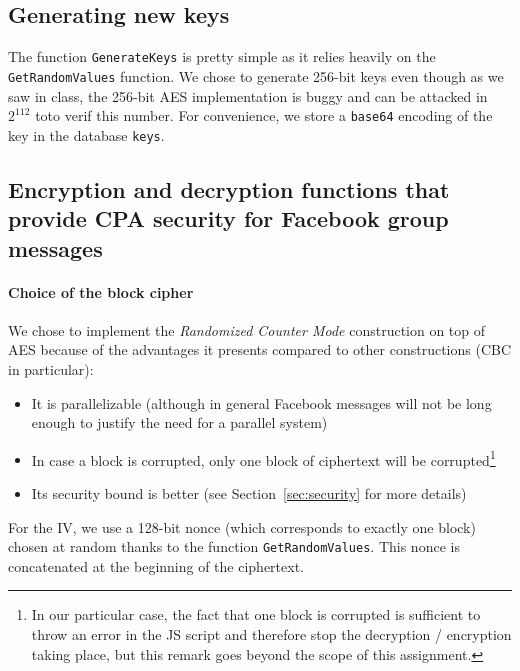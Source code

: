 \documentclass[10pt,twocolumn]{article}
\begin{document}

\subsection{Generating new keys}
The function \texttt{GenerateKeys} is pretty simple as it relies heavily on the \texttt{GetRandomValues} function. We chose to generate 256-bit keys even though as we saw in class, the 256-bit AES implementation is buggy and can be attacked in $2^{112}$ toto verif this number. For convenience, we store a \texttt{base64} encoding of the key in the database \texttt{keys}.



\subsection{Encryption and decryption functions that provide CPA security for Facebook group messages}
\paragraph{Choice of the block cipher}
We chose to implement the \emph{Randomized Counter Mode} construction on top of AES because of the advantages it presents compared to other constructions (CBC in particular):
\begin{itemize}
\item It is parallelizable (although in general Facebook messages will not be long enough to justify the need for a parallel system)
\item In case a block is corrupted, only one block of ciphertext will be corrupted\footnote{In our particular case, the fact that one block is corrupted is sufficient to throw an error in the JS script and therefore stop the decryption / encryption taking place, but this remark goes beyond the scope of this assignment.}
\item Its security bound is better (see Section~\ref{sec:security} for more details)
\end{itemize}
For the IV, we use a 128-bit nonce (which corresponds to exactly one block) chosen at random thanks to the function \texttt{GetRandomValues}. This nonce is concatenated at the beginning of the ciphertext.
\end{document}
